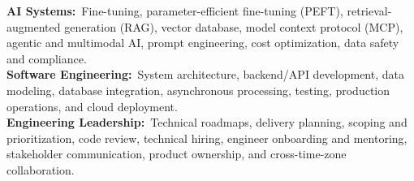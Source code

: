 
\begin{cvparagraph}
{\bodyfont\bfseries AI Systems:}~Fine-tuning, parameter-efficient fine-tuning (PEFT), retrieval-augmented generation (RAG), vector database, model context protocol (MCP), agentic and multimodal AI, prompt engineering, cost optimization, data safety and compliance.
\\[2mm]
{\bodyfont\bfseries Software Engineering:}~System architecture, backend/API development, data modeling, database integration, asynchronous processing, testing, production operations, and cloud deployment.
\\[2mm]
{\bodyfont\bfseries Engineering Leadership:}~Technical roadmaps, delivery planning, scoping and prioritization, code review, technical hiring, engineer onboarding and mentoring, stakeholder communication, product ownership, and cross-time-zone collaboration.
\end{cvparagraph}
